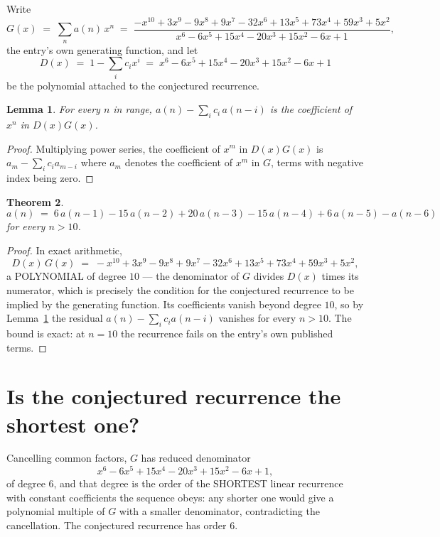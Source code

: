 \documentclass[11pt,a4paper]{article}
\theoremstyle{plain}
\newtheorem{theorem}{Theorem}
\newtheorem{lemma}[theorem]{Lemma}
\theoremstyle{definition}
\begin{document}
Write
\[
G(x)\;=\;\sum_{n}a(n)\,x^{n}\;=\;\frac{- x^{10} + 3 x^{9} - 9 x^{8} + 9 x^{7} - 32 x^{6} + 13 x^{5} + 73 x^{4} + 59 x^{3} + 5 x^{2}}{x^{6} - 6 x^{5} + 15 x^{4} - 20 x^{3} + 15 x^{2} - 6 x + 1},
\]
the entry's own generating function, and let
\[
D(x)\;=\;1-\sum_i c_i x^{i}\;=\;x^{6} - 6 x^{5} + 15 x^{4} - 20 x^{3} + 15 x^{2} - 6 x + 1
\]
be the polynomial attached to the conjectured recurrence.

\begin{lemma}\label{lem:key}
For every $n$ in range, $a(n)-\sum_i c_i\,a(n-i)$ is the coefficient of $x^{n}$ in
$D(x)G(x)$.
\end{lemma}

\begin{proof}
Multiplying power series, the coefficient of $x^{m}$ in $D(x)G(x)$ is
$a_m-\sum_i c_i a_{m-i}$ where $a_m$ denotes the coefficient of $x^{m}$ in $G$, terms with
negative index being zero.
\end{proof}

\begin{theorem}
\[
a(n)\;=\;6\,a(n-1) - 15\,a(n-2) + 20\,a(n-3) - 15\,a(n-4) + 6\,a(n-5) - a(n-6)
\]
for every $n>10$.
\end{theorem}

\begin{proof}
In exact arithmetic,
\[
D(x)\,G(x)\;=\;- x^{10} + 3 x^{9} - 9 x^{8} + 9 x^{7} - 32 x^{6} + 13 x^{5} + 73 x^{4} + 59 x^{3} + 5 x^{2},
\]
a POLYNOMIAL of degree $10$ --- the denominator of $G$ divides $D(x)$ times its numerator,
which is precisely the condition for the conjectured recurrence to be implied by the
generating function. Its coefficients vanish beyond degree $10$, so by
Lemma~\ref{lem:key} the residual $a(n)-\sum_ic_ia(n-i)$ vanishes for every
$n>10$. The bound is exact: at $n=10$ the recurrence fails on the entry's own published terms.
\end{proof}

\section{Is the conjectured recurrence the shortest one?}

Cancelling common factors, $G$ has reduced denominator
\[
x^{6} - 6 x^{5} + 15 x^{4} - 20 x^{3} + 15 x^{2} - 6 x + 1,
\]
of degree $6$, and that degree is the order of the SHORTEST linear recurrence with
constant coefficients the sequence obeys: any shorter one would give a polynomial multiple of
$G$ with a smaller denominator, contradicting the cancellation. The conjectured recurrence has
order $6$.
\end{document}
